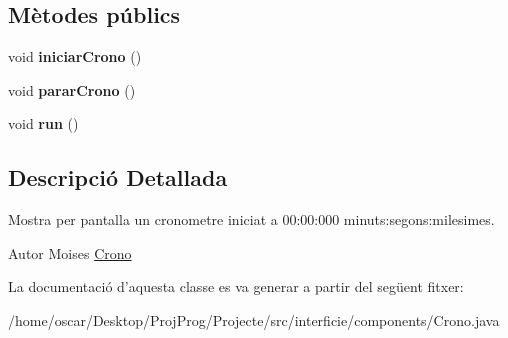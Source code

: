 \subsection*{Mètodes públics}
\begin{DoxyCompactItemize}
\item 
\hypertarget{classinterficie_1_1components_1_1_crono_aa890cf3bea27a9c0822bf6066de35929}{void {\bfseries iniciar\+Crono} ()}\label{classinterficie_1_1components_1_1_crono_aa890cf3bea27a9c0822bf6066de35929}

\item 
\hypertarget{classinterficie_1_1components_1_1_crono_a0d8681481d3795a79da8a6c47dac8811}{void {\bfseries parar\+Crono} ()}\label{classinterficie_1_1components_1_1_crono_a0d8681481d3795a79da8a6c47dac8811}

\item 
\hypertarget{classinterficie_1_1components_1_1_crono_a0ecb7df579cc0a6476c56517afd50627}{void {\bfseries run} ()}\label{classinterficie_1_1components_1_1_crono_a0ecb7df579cc0a6476c56517afd50627}

\end{DoxyCompactItemize}


\subsection{Descripció Detallada}
Mostra per pantalla un cronometre iniciat a 00\+:00\+:000 minuts\+:segons\+:milesimes. 

\begin{DoxyAuthor}{Autor}
Moises  \hyperlink{classinterficie_1_1components_1_1_crono}{Crono} 
\end{DoxyAuthor}


La documentació d'aquesta classe es va generar a partir del següent fitxer\+:\begin{DoxyCompactItemize}
\item 
/home/oscar/\+Desktop/\+Proj\+Prog/\+Projecte/src/interficie/components/Crono.\+java\end{DoxyCompactItemize}
